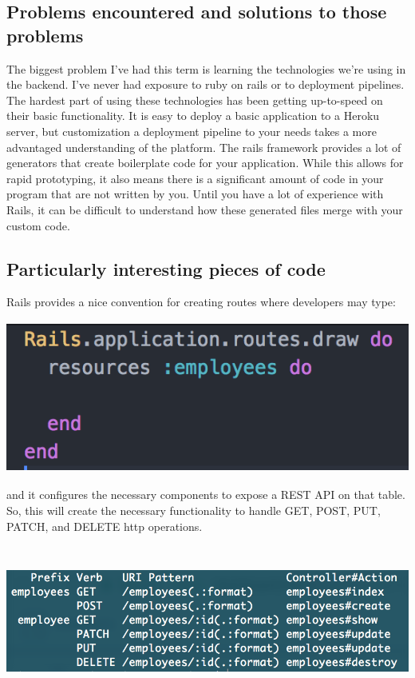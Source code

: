 \documentclass[draftclsnofoot,onecolumn,letterpaper,10pt,compsoc]{IEEEtran}
\begin{document}
\subsection{Problems encountered and solutions to those problems}
The biggest problem I’ve had this term is learning the technologies we’re using in the backend.
I’ve never had exposure to ruby on rails or to deployment pipelines.
The hardest part of using these technologies has been getting up-to-speed on their basic functionality.
It is easy to deploy a basic application to a Heroku server, but customization a deployment pipeline to your needs takes a more advantaged understanding of the platform.
The rails framework provides a lot of generators that create boilerplate code for your application.
While this allows for rapid prototyping, it also means there is a significant amount of code in your program that are not written by you.
Until you have a lot of experience with Rails, it can be difficult to understand how these generated files merge with your custom code.

\subsection{Particularly interesting pieces of code}
Rails provides a nice convention for creating routes where developers may type:

\centerline{\includegraphics[height=5cm]{screenshots/routesrb.png}}

and it configures the necessary components to expose a REST API on that table.
So, this will create the necessary functionality to handle GET, POST, PUT, PATCH, and DELETE http operations.

\centerline{\includegraphics[height=5cm]{screenshots/showroutes.png}}
\end{document}
